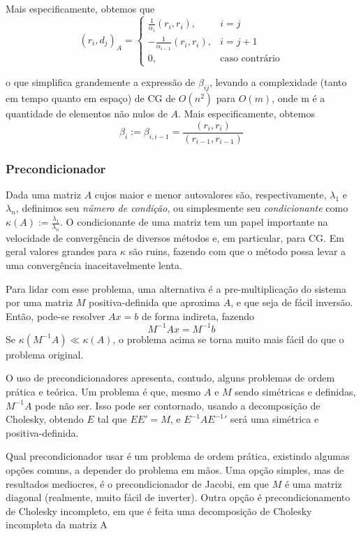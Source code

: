 \documentclass[11pt]{article}
\begin{document}
Mais especificamente, obtemos que \[
(r_i, d_j)_A = \begin{cases} \frac1{\alpha_i} (r_i,r_i), & i = j \\
                            -\frac1{\alpha_{i-1}} (r_i,r_i), & i = j + 1\\ 
                              0, & \text{caso contrário}
                              \end{cases}
\]

o que simplifica grandemente a expressão de \(\beta_{ij}\), levando a
complexidade (tanto em tempo quanto em espaço) de CG de \(O(n^2)\) para
\(O(m)\), onde m é a quantidade de elementos não nulos de \(A\). Mais
especificamente, obtemos \[
\beta_i := \beta_{i,i-1} = \frac{(r_i,r_i)}{(r_{i-1},r_{i-1})}
\]

    \subsubsection{Precondicionador}\label{precondicionador}

    Dada uma matriz \(A\) cujos maior e menor autovalores são,
respectivamente, \(\lambda_1\) e \(\lambda_n\), definimos seu
\emph{número de condição}, ou simplesmente seu \emph{condicionante} como
\(\kappa(A) := \frac{\lambda_1}{\lambda_n}\). O condicionante de uma
matriz tem um papel importante na velocidade de convergência de diversos
métodos e, em particular, para CG. Em geral valores grandes para
\(\kappa\) são ruins, fazendo com que o método possa levar a uma
convergência inaceitavelmente lenta.

    Para lidar com esse problema, uma alternativa é a pre-multiplicação do
sistema por uma matriz \(M\) positiva-definida que aproxima \(A\), e que
seja de fácil inversão. Então, pode-se resolver \(Ax = b\) de forma
indireta, fazendo \[
M^{-1}Ax = M^{-1}b
\] Se \(\kappa(M^{-1}A) \ll \kappa(A)\), o problema acima se torna muito
mais fácil do que o problema original.

O uso de precondicionadores apresenta, contudo, alguns problemas de
ordem prática e teórica. Um problema é que, mesmo \(A\) e \(M\) sendo
simétricas e definidas, \(M^{-1}A\) pode não ser. Isso pode ser
contornado, usando a decomposição de Cholesky, obtendo \(E\) tal que
\(EE' = M\), e \(E^{-1}AE^{-1}'\) será uma simétrica e
positiva-definida.

Qual precondicionador usar é um problema de ordem prática, existindo
algumas opções comuns, a depender do problema em mãos. Uma opção
simples, mas de resultados mediocres, é o precondicionador de Jacobi, em
que \(M\) é uma matriz diagonal (realmente, muito fácil de inverter).
Outra opção é precondicionamento de Cholesky incompleto, em que é feita
uma decomposição de Cholesky incompleta da matriz A
\end{document}
